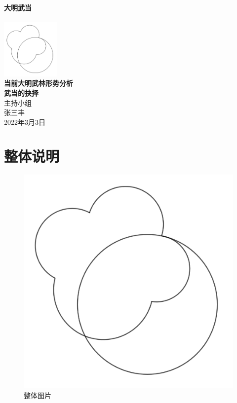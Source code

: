 \documentclass[12pt]{article}
\begin{document}
\begin{titlepage}
\begin{center}
\linespread{1.2}\huge {\bfseries 大明武当 \\     }\\[1cm]
\linespread{1}
\includegraphics[height=2.9cm]{logo.png}\\[2cm]
\linespread{1.9}\huge {\bfseries 当前大明武林形势分析}\\
\linespread{1.9}\LARGE {\bfseries 武当的抉择}\\[2.5cm]

{\Large 主持小组}\\[0.3cm]
\Large 张三丰\\[4cm] 
\large 2022年3月3日
\end{center}
\end{titlepage}

\tableofcontents

\section{整体说明}

\begin{figure}[H]
  \centering
  \includegraphics[width=\textwidth]{logo.png}
  \caption{整体图片}
  \label{整体图片}
\end{figure}
\end{document}
